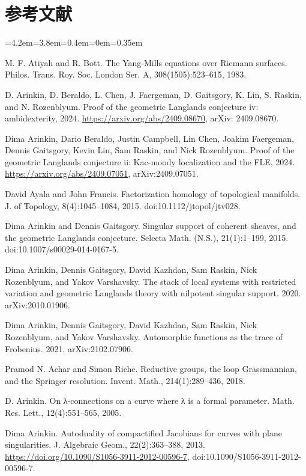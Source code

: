 \section*{参考文献}
\begin{list}{}{\leftmargin=4.2em=3.8em=0.4em\itemindent=0em\parsep=0.35em}
\item[{AB83}] M. F. Atiyah and R. Bott. The Yang-Mills equations over Riemann surfaces. Philos. Trans. Roy. Soc. London Ser. A, 308(1505):523–615, 1983.
\item[{ABC+24a}] D. Arinkin, D. Beraldo, L. Chen, J. Faergeman, D. Gaitsgory, K. Lin, S. Raskin, and N. Rozenblyum. Proof of the geometric Langlands conjecture iv: ambidexterity, 2024. \url{https://arxiv.org/abs/2409.08670}, arXiv: 2409.08670.
\item[{ABC+24b}] Dima Arinkin, Dario Beraldo, Justin Campbell, Lin Chen, Joakim Faergeman, Dennis Gaitsgory, Kevin Lin, Sam Raskin, and Nick Rozenblyum. Proof of the geometric Langlands conjecture ii: Kac-moody localization and the FLE, 2024. \url{https://arxiv.org/abs/2409.07051}, arXiv:2409.07051.
\item[{AF15}] David Ayala and John Francis. Factorization homology of topological manifolds. J. of Topology, 8(4):1045–1084, 2015. doi:10.1112/jtopol/jtv028.
\item[{AG15}] Dima Arinkin and Dennis Gaitsgory. Singular support of coherent sheaves, and the geometric Langlands conjecture. Selecta Math. (N.S.), 21(1):1–199, 2015. doi:10.1007/s00029-014-0167-5.
\item[{AGK+20}] Dima Arinkin, Dennis Gaitsgory, David Kazhdan, Sam Raskin, Nick Rozenblyum, and Yakov Varshavsky. The stack of local systems with restricted variation and geometric Langlands theory with nilpotent singular support. 2020. arXiv:2010.01906.
\item[{AGK+21}] Dima Arinkin, Dennis Gaitsgory, David Kazhdan, Sam Raskin, Nick Rozenblyum, and Yakov Varshavsky. Automorphic functions as the trace of Frobenius. 2021. arXiv:2102.07906.
\item[{AR18}] Pramod N. Achar and Simon Riche. Reductive groups, the loop Grassmannian, and the Springer resolution. Invent. Math., 214(1):289–436, 2018.
\item[{Ari05}] D. Arinkin. On λ-connections on a curve where λ is a formal parameter. Math. Res. Lett., 12(4):551–565, 2005.
\item[{Ari13}] Dima Arinkin. Autoduality of compactified Jacobians for curves with plane singularities. J. Algebraic Geom., 22(2):363–388, 2013. \url{https://doi.org/10.1090/S1056-3911-2012-00596-7}, doi:10.1090/S1056-3911-2012-00596-7.

\end{list}
